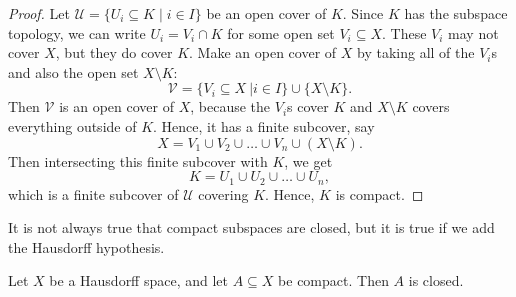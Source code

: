 \documentclass[noname]{notes}
\begin{document}
\begin{proof}
	Let $\mathcal U = \{U_i \subseteq K \mid i \in I\}$ be an open cover of $K$. Since $K$ has the subspace topology, we can write $U_i = V_i \cap K$ for some open set $V_i\subseteq X$. These $V_i$ may not cover $X$, but they do cover $K$. Make an open cover of $X$ by taking all of the $V_i$s and also the open set $X \setminus K$:
	\[
		\mathcal V = \Big\{ V_i \subseteq X \ \Big\vert i \in I \Big\} \cup \Big\{ X \setminus K \Big\}. 
	\]
	Then $\mathcal V$ is an open cover of $X$, because the $V_i$s cover $K$ and $X \setminus K$ covers everything outside of $K$. Hence, it has a finite subcover, say 
	\[
		X = V_1 \cup V_2 \cup \ldots \cup V_n \cup (X \setminus K). 
	\]
	Then intersecting this finite subcover with $K$, we get 
	\[
		K = U_1 \cup U_2 \cup \ldots \cup U_n,
	\]
	which is a finite subcover of $\mathcal U$ covering $K$. Hence, $K$ is compact. 
\end{proof}

It is not always true that compact subspaces are closed, but it is true if we add the Hausdorff hypothesis. 

\begin{theorem}
	\label{compact subspaces of Hausdorff are closed}
	Let $X$ be a Hausdorff space, and let $A \subseteq X$ be compact. Then $A$ is closed. 
\end{theorem}
\end{document}
